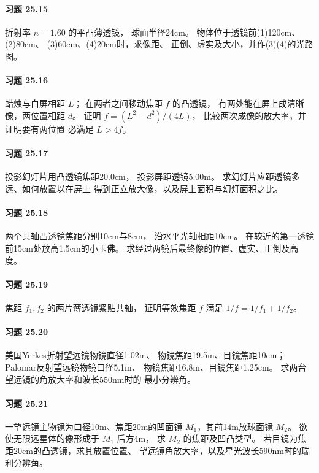 \paragraph{习题 25.15}
折射率 \(n=1.60\) 的平凸薄透镜，
球面半径24cm。
物体位于透镜前(1)120cm、(2)80cm、
(3)60cm、(4)20cm时，求像距、
正倒、虚实及大小，并作(3)(4)的光路图。
\paragraph{习题 25.16}
蜡烛与白屏相距 \(L\)；
在两者之间移动焦距 \(f\) 的凸透镜，
有两处能在屏上成清晰像，两位置相距 \(d\)。
证明 \(f=(L^2-d^2)/(4L)\)，
比较两次成像的放大率，并证明要有两位置
必满足 \(L>4f\)。
\paragraph{习题 25.17}
投影幻灯片用凸透镜焦距20.0cm，
投影屏距透镜5.00m。
求幻灯片应距透镜多远、如何放置以在屏上
得到正立放大像，以及屏上面积与幻灯面积之比。
\paragraph{习题 25.18}
两个共轴凸透镜焦距分别10cm与8cm，
沿水平光轴相距10cm。
在较近的第一透镜前15cm处放高1.5cm的小玉佛。
求经过两镜后最终像的位置、虚实、正倒及高度。
\paragraph{习题 25.19}
焦距 \(f_1,f_2\) 的两片薄透镜紧贴共轴，
证明等效焦距 \(f\) 满足 \(1/f=1/f_1+1/f_2\)。
\paragraph{习题 25.20}
美国Yerkes折射望远镜物镜直径1.02m、
物镜焦距19.5m、目镜焦距10cm；
Palomar反射望远镜物镜口径5.1m、
物镜焦距16.8m、目镜焦距1.25cm。
求两台望远镜的角放大率和波长550nm时的
最小分辨角。
\paragraph{习题 25.21}
一望远镜主物镜为口径10m、焦距20m的凹面镜
\(M_1\)，其前14m放球面镜 \(M_2\)。
欲使无限远星体的像形成于 \(M_1\) 后方4m，
求 \(M_2\) 的焦距及凹凸类型。
若目镜为焦距20cm的凸透镜，求其放置位置、
望远镜角放大率，以及星光波长590nm时的瑞利分辨角。
